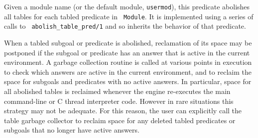 \begin{description}
\begin{description}
{%



}
%
Given a module name (or the default module, {\tt usermod}), this
predicate abolishes all tables for each tabled predicate in {\tt
  Module}.  It is implemented using a series of calls to {\tt
  abolish\_table\_pred/1} and so inherits the behavior of that
predicate.


%
When a tabled subgoal or predicate is abolished, reclamation of its
space may be postponed if the subgoal or predicate has an answer that
is active in the current environment.  A garbage collection routine is
called at various points in execution to check which answers are
active in the current environment, and to reclaim the space for
subgoals and predicates with no active answers.  In particular, space
for all abolished tables is reclaimed whenever the engine re-executes
the main command-line or C thread interpreter code.  However in rare
situations this strategy may not be adequate.  For this reason, the
user can explicitly call the table garbage collector to reclaim space
for any deleted tabled predicates or subgoals that no longer have
active answers.


\end{description}
\end{description}
